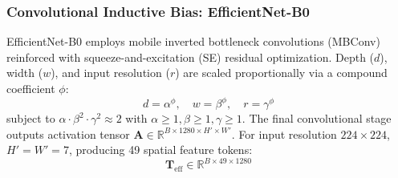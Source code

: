 \documentclass[journal]{IEEEtran}
\begin{document}
\subsubsection{Convolutional Inductive Bias: EfficientNet-B0}
EfficientNet-B0 employs mobile inverted bottleneck convolutions (MBConv) reinforced with squeeze-and-excitation (SE) residual optimization. Depth ($d$), width ($w$), and input resolution ($r$) are scaled proportionally via a compound coefficient $\phi$:
\begin{equation}
d = \alpha^\phi, \quad w = \beta^\phi, \quad r = \gamma^\phi
\end{equation}
subject to $\alpha \cdot \beta^2 \cdot \gamma^2 \approx 2$ with $\alpha \ge 1, \beta \ge 1, \gamma \ge 1$.
The final convolutional stage outputs activation tensor $\mathbf{A} \in \mathbb{R}^{B \times 1280 \times H' \times W'}$. For input resolution $224 \times 224$, $H'=W'=7$, producing 49 spatial feature tokens:
\begin{equation}
\mathbf{T}_{\text{eff}} \in \mathbb{R}^{B \times 49 \times 1280}
\end{equation}
\end{document}
